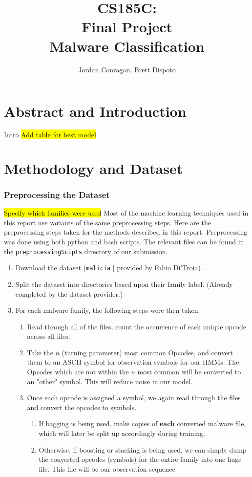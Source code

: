 \documentclass[12pt]{article}
\title{CS185C: \\ 
Final Project \\
Malware Classification}
\author{Jordan Conragan,  Brett Dispoto}
\begin{document}
\maketitle
\tableofcontents
\newpage

\part{Abstract and Introduction}
  Intro
\hl{Add table for best model}

\part{Methodology and Dataset}
\section{Preprocessing the Dataset}
\hl{Specify which families were used}
Most of the machine learning techniques used in this report use variants of the same preprocessing steps. Here are the preprocessing steps taken for the methods described in this report. Preprocessing was done using both python and bash scripts. The relevant files can be found in the \texttt{preprocessingScipts} directory of our submission.
  \begin{enumerate}
  \item Download the dataset (\texttt{malicia} | provided by Fabio Di'Troia).
    \item Split the dataset into directories based upon their family label. (Already completed by the dataset provider.)
    \item For each malware family, the following steps were then taken:
      \begin{enumerate}
        \item Read through all of the files, count the occurrence of each unique opcode across all files.
        \item Take the $n$ (turning parameter) most common Opcodes, and convert them to an ASCII symbol for observation symbols for our HMMs. The Opcodes which are not within the $n$ most common will be converted to an "other" symbol. This will reduce noise in our model.
        \item Once each opcode is assigned a symbol, we again read through the files and convert the opcodes to symbols.

        \begin{enumerate}
          \item If bagging is being used, make copies of \textbf{each} converted malware file, which will later be split up accordingly during training.
          \item Otherwise, if boosting or stacking is being used, we can simply dump the converted opcodes (symbols) for the entire family into one huge file. This file will be our observation sequence.
        \end{enumerate}
      \end{enumerate}
  \end{enumerate}
\end{document}
